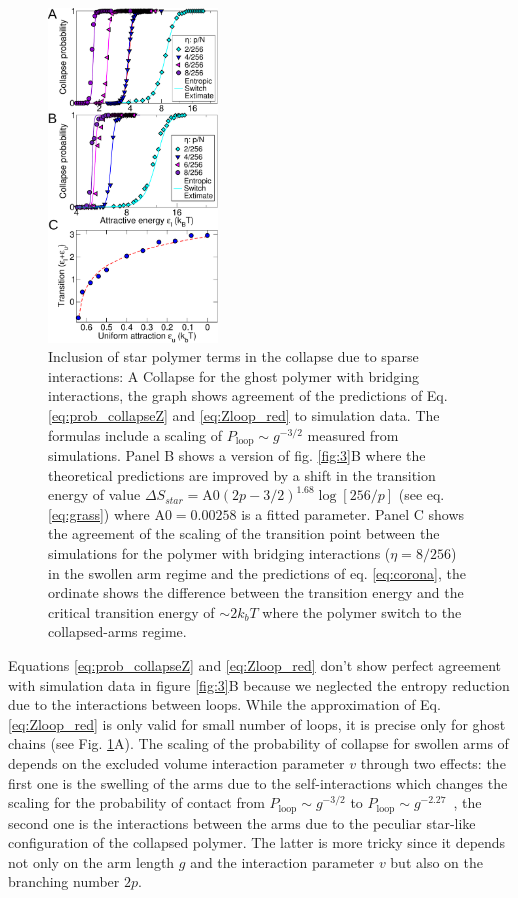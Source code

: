 \documentclass[
preprint,
a4paper,
12pt,
superscriptaddress,
pre]{revtex4}
\begin{document}
\begin{figure}
  \centering
  \includegraphics[width=0.4\textwidth]{fig6}
  \caption{Inclusion of star polymer terms in the collapse due to
    sparse interactions: A Collapse for the ghost polymer with
    bridging interactions, the graph shows agreement of the
    predictions of Eq. \ref{eq:prob_collapseZ} and \ref{eq:Zloop_red}
    to simulation data. The formulas include a scaling of
    $P_\mathrm{loop} \sim g^{-3/2}$ measured from simulations. Panel B
    shows a version of fig. \ref{fig:3}B where the theoretical
    predictions are improved by a shift in the transition energy of
    value $\Delta S_{star} = \mathrm{A0} (2p - 3/2)^{1.68}
    \log[256/p]$ (see eq. \ref{eq:grass}) where $\mathrm{A0} =
    0.00258$ is a fitted parameter. Panel C shows the agreement of
    the scaling of the transition point between the simulations for
    the polymer with bridging interactions ($\eta = 8/256$) in the
    swollen arm regime and the predictions of eq. \ref{eq:corona}, the
    ordinate shows the difference between the transition energy and
    the critical transition energy of $\sim 2 k_b T$ where the polymer
    switch to the collapsed-arms regime.}
  \label{fig:6}
\end{figure}

Equations \ref{eq:prob_collapseZ} and \ref{eq:Zloop_red} don't show
perfect agreement with simulation data in figure \ref{fig:3}B because
we neglected the entropy reduction due to the interactions between
loops. While the approximation of Eq.~ \ref{eq:Zloop_red} is only
valid for small number of loops, it is precise only for
ghost chains (see Fig. \ref{fig:6}A). The scaling of the probability
of collapse for swollen arms of depends on the excluded volume
interaction parameter $v$ through two effects: the first one is the
swelling of the arms due to the self-interactions which changes the
scaling for the probability of contact from $P_\mathrm{loop} \sim g^{-3/2}$
to $P_\mathrm{loop} \sim g^{-2.27}$~\cite{Marenduzzo2006c}, the second
one is the interactions between the arms due to the peculiar star-like
configuration of the collapsed polymer. The latter is more tricky
since it depends not only on the arm length $g$ and the interaction
parameter $v$ but also on the branching number $2p$.
\end{document}
